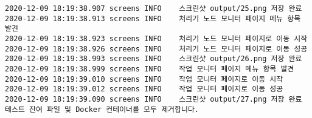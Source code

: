 \begin{Verbatim}[fontsize=\tiny, breaklines=true, breakanywhere=true]
2020-12-09 18:19:38.907 screens	INFO	스크린샷 output/25.png 저장 완료
2020-12-09 18:19:38.913 screens	INFO	처리기 노드 모니터 페이지 메뉴 항목 발견
2020-12-09 18:19:38.923 screens	INFO	처리기 노드 모니터 페이지로 이동 시작
2020-12-09 18:19:38.926 screens	INFO	처리기 노드 모니터 페이지로 이동 성공
2020-12-09 18:19:38.993 screens	INFO	스크린샷 output/26.png 저장 완료
2020-12-09 18:19:38.999 screens	INFO	작업 모니터 페이지 메뉴 항목 발견
2020-12-09 18:19:39.010 screens	INFO	작업 모니터 페이지로 이동 시작
2020-12-09 18:19:39.012 screens	INFO	작업 모니터 페이지로 이동 성공
2020-12-09 18:19:39.090 screens	INFO	스크린샷 output/27.png 저장 완료
테스트 잔여 파일 및 Docker 컨테이너를 모두 제거합니다.
\end{Verbatim}
